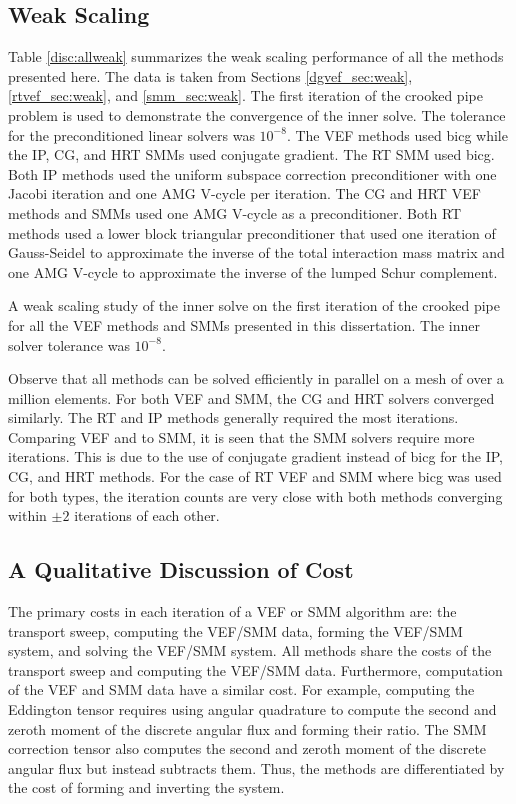 \documentclass[../doc.tex]{subfiles}
\begin{document}
\subsection{Weak Scaling}
Table \ref{disc:allweak} summarizes the weak scaling performance of all the methods presented here. The data is taken from Sections \ref{dgvef_sec:weak}, \ref{rtvef_sec:weak}, and \ref{smm_sec:weak}. The first iteration of the crooked pipe problem is used to demonstrate the convergence of the inner solve. The tolerance for the preconditioned linear solvers was $10^{-8}$. The VEF methods used \gls{bicg} while the IP, CG, and HRT SMMs used conjugate gradient. The RT SMM used \gls{bicg}. Both IP methods used the uniform subspace correction preconditioner with one Jacobi iteration and one AMG V-cycle per iteration. The CG and HRT VEF methods and SMMs used one AMG V-cycle as a preconditioner. Both RT methods used a lower block triangular preconditioner that used one iteration of Gauss-Seidel to approximate the inverse of the total interaction mass matrix and one AMG V-cycle to approximate the inverse of the lumped Schur complement. 
\begin{table}
\centering
\caption{A weak scaling study of the inner solve on the first iteration of the crooked pipe for all the VEF methods and SMMs presented in this dissertation. The inner solver tolerance was $10^{-8}$.}
\label{disc:allweak}

\end{table}

Observe that all methods can be solved efficiently in parallel on a mesh of over a million elements. For both VEF and SMM, the CG and HRT solvers converged similarly. The RT and IP methods generally required the most iterations. Comparing VEF and to SMM, it is seen that the SMM solvers require more iterations. This is due to the use of conjugate gradient instead of \gls{bicg} for the IP, CG, and HRT methods. For the case of RT VEF and SMM where \gls{bicg} was used for both types, the iteration counts are very close with both methods converging within $\pm 2$ iterations of each other. 

\subsection{A Qualitative Discussion of Cost}
The primary costs in each iteration of a VEF or SMM algorithm are: the transport sweep, computing the VEF/SMM data, forming the VEF/SMM system, and solving the VEF/SMM system. All methods share the costs of the transport sweep and computing the VEF/SMM data. Furthermore, computation of the VEF and SMM data have a similar cost. For example, computing the Eddington tensor requires using angular quadrature to compute the second and zeroth moment of the discrete angular flux and forming their ratio. The SMM correction tensor also computes the second and zeroth moment of the discrete angular flux but instead subtracts them. Thus, the methods are differentiated by the cost of forming and inverting the system. 

\end{document}
